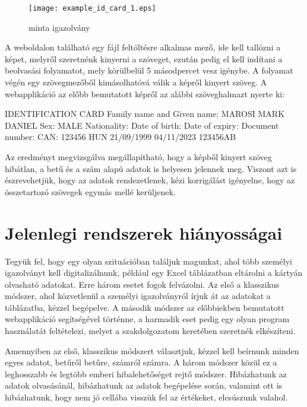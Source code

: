 \documentclass[12pt]{report}
\begin{document}
\newline

\begin{figure}[h]
  \centerline{\texttt{[image: example\_id\_card\_1.eps]}}
  \caption{minta igazolvány}
\end{figure}

\pagebreak

A weboldalon található egy fájl feltöltésre alkalmas mező, ide kell tallózni a képet, melyről szeretnénk kinyerni a szöveget, ezután pedig el kell indítani a beolvasási folyamatot, mely körülbelül 5 másodpercet vesz igénybe. A folyamat végén egy szövegmezőből kimásolhatóvá válik a képről kinyert szöveg. A webapplikáció az előbb bemutatott képről az alábbi szöveghalmazt nyerte ki:
\newline
\begin{tcolorbox}
    IDENTIFICATION CARD Family name and Given name: MAROSI MARK DANIEL Sex: MALE Nationality: Date of birth: Date of expiry: Document number: CAN: 123456 HUN 21/09/1999 04/11/2023 123456AB
\end{tcolorbox}
\newline
\noindent
Az eredményt megvizsgálva megállapítható, hogy a képből kinyert szöveg hibátlan, a betű és a szám alapú adatok is helyesen jelennek meg. Viszont azt is észrevehetjük, hogy az adatok rendezetlenek, kézi korrigálást igényelne, hogy az összetartozó szövegek egymás mellé kerüljenek.

\section{Jelenlegi rendszerek hiányosságai}

Tegyük fel, hogy egy olyan szituációban találjuk magunkat, ahol több személyi igazolványt kell digitalizálnunk, például egy Excel táblázatban eltárolni a kártyán olvasható adatokat. Erre három esetet fogok felvázolni. Az első a klasszikus módszer, ahol közvetlenül a személyi igazolványról írjuk át az adatokat a táblázatba, kézzel begépelve. A második módszer az előbbiekben bemutatott webapplikáció segítségével történne, a harmadik eset pedig egy olyan program használatát feltételezi, melyet a szakdolgozatom keretében szeretnék elkészíteni.

Amennyiben az első, klasszikus módszert választjuk, kézzel kell beírnunk minden egyes adatot, betűről betűre, számról számra. A három módszer közül ez a leghosszabb és legtöbb emberi hibalehetőséget rejtő módszer. Hibázhatunk az adatok olvasásánál, hibázhatunk az adatok begépelése során, valamint ott is hibázhatunk, hogy nem jó cellába visszük fel az értékeket, elcsúszunk valahol.
\end{document}

